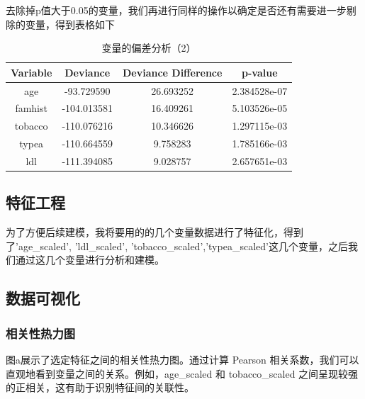 \documentclass[UTF8]{article}
\begin{document}
去除掉p值大于0.05的变量，我们再进行同样的操作以确定是否还有需要进一步剔除的变量，得到表格如下
\begin{table}[ht]
	\centering
	\caption{变量的偏差分析（2）}
	\begin{tabular}{|c|c|c|c|}
		\hline
		\textbf{Variable} & \textbf{Deviance} & \textbf{Deviance Difference} & \textbf{p-value} \\ \hline
		age       & -93.729590   & 26.693252 & 2.384528e-07 \\ \hline
		famhist   & -104.013581  & 16.409261 & 5.103526e-05 \\ \hline
		tobacco   & -110.076216  & 10.346626 & 1.297115e-03 \\ \hline
		typea     & -110.664559  & 9.758283  & 1.785166e-03 \\ \hline
		ldl       & -111.394085  & 9.028757  & 2.657651e-03 \\ \hline
	\end{tabular}
	\label{table:deviance_analysis}
\end{table}
	\subsection{特征工程}
	为了方便后续建模，我将要用的的几个变量数据进行了特征化，得到了'age\_scaled', 'ldl\_scaled', 'tobacco\_scaled','typea\_scaled'这几个变量，之后我们通过这几个变量进行分析和建模。   
	\subsection{数据可视化}
	\subsubsection{相关性热力图}
	图a展示了选定特征之间的相关性热力图。通过计算 Pearson 相关系数，我们可以直观地看到变量之间的关系。例如，age\_scaled 和 tobacco\_scaled 之间呈现较强的正相关，这有助于识别特征间的关联性。
	\begin{figure}[htbp]
		\centering
	\end{figure}
\end{document}
